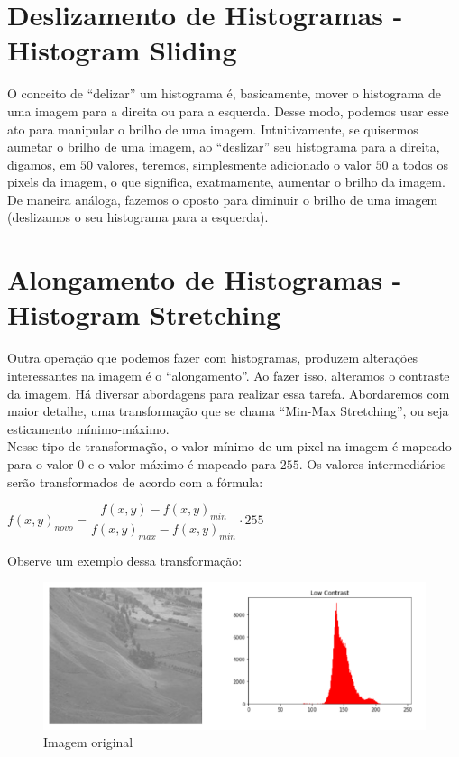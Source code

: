 \documentclass[a4paper, 12pt]{article}
\begin{document}
\section{Deslizamento de Histogramas - Histogram Sliding}
O conceito de ``delizar'' um histograma é, basicamente, mover o histograma de uma imagem para a direita ou para a esquerda. Desse modo, podemos usar esse ato 
para manipular o brilho de uma imagem. Intuitivamente, se quisermos aumetar o brilho de uma imagem, ao ``deslizar'' seu histograma para a direita, digamos, em 
$50$ valores, teremos, simplesmente adicionado o valor $50$ a todos os pixels da imagem, o que significa, exatmamente, aumentar o brilho da imagem. De maneira 
análoga, fazemos o oposto para diminuir o brilho de uma imagem (deslizamos o seu histograma para a esquerda).

\section{Alongamento de Histogramas - Histogram Stretching}
Outra operação que podemos fazer com histogramas, produzem alterações interessantes na imagem é o ``alongamento''. Ao fazer isso, alteramos o contraste da imagem.
Há diversar abordagens para realizar essa tarefa. Abordaremos com maior detalhe, uma transformação que se chama ``Min-Max Stretching'', ou seja 
esticamento mínimo-máximo.
\\

Nesse tipo de transformação, o valor mínimo de um pixel na imagem é mapeado para o valor $0$ e o valor máximo é mapeado para $255$. Os valores intermediários 
serão transformados de acordo com a fórmula: 
\begin{center}
$f(x,y)_{novo} = \dfrac{f(x, y) - f(x, y)_{min}}{f(x, y)_{max} - f(x, y)_{min}} \cdot 255$
\end{center}
Observe um exemplo dessa transformação:
\\
\begin{figure}[!htbp]
	\centering
	\includegraphics[scale=0.5]{images/origins.png}
	\caption{Imagem original}
\end{figure}
\\
\end{document}
